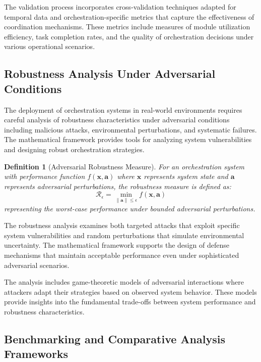\documentclass[12pt,a4paper]{article}
\newtheorem{definition}[theorem]{Definition}
\begin{document}
The validation process incorporates cross-validation techniques adapted for temporal data and orchestration-specific metrics that capture the effectiveness of coordination mechanisms. These metrics include measures of module utilization efficiency, task completion rates, and the quality of orchestration decisions under various operational scenarios.

\subsection{Robustness Analysis Under Adversarial Conditions}

The deployment of orchestration systems in real-world environments requires careful analysis of robustness characteristics under adversarial conditions including malicious attacks, environmental perturbations, and systematic failures. The mathematical framework provides tools for analyzing system vulnerabilities and designing robust orchestration strategies.

\begin{definition}[Adversarial Robustness Measure]
For an orchestration system with performance function $f(\mathbf{x}, \mathbf{a})$ where $\mathbf{x}$ represents system state and $\mathbf{a}$ represents adversarial perturbations, the robustness measure is defined as:
\begin{equation}
\mathcal{R}_{\epsilon} = \min_{\|\mathbf{a}\| \leq \epsilon} f(\mathbf{x}, \mathbf{a})
\end{equation}
representing the worst-case performance under bounded adversarial perturbations.
\end{definition}

The robustness analysis examines both targeted attacks that exploit specific system vulnerabilities and random perturbations that simulate environmental uncertainty. The mathematical framework supports the design of defense mechanisms that maintain acceptable performance even under sophisticated adversarial scenarios.

The analysis includes game-theoretic models of adversarial interactions where attackers adapt their strategies based on observed system behavior. These models provide insights into the fundamental trade-offs between system performance and robustness characteristics.

\subsection{Benchmarking and Comparative Analysis Frameworks}
\end{document}
